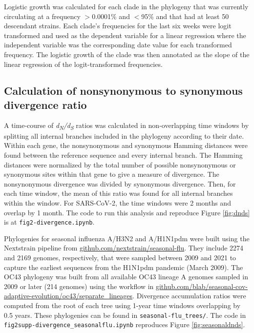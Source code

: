 \documentclass[11pt,oneside,letterpaper]{article}
\newcommand{\dnds}{\emph{d\textsubscript{N}/d\textsubscript{S}}}
\begin{document}
Logistic growth was calculated for each clade in the phylogeny that was currently circulating at a frequency $>$0.0001\% and $<$95\% and that had at least 50 descendant strains.
Each clade's frequencies for the last six weeks were logit transformed and used as the dependent variable for a linear regression where the independent variable was the corresponding date value for each transformed frequency.
The logistic growth of the clade was then annotated as the slope of the linear regression of the logit-transformed frequencies.

\subsection*{Calculation of nonsynonymous to synonymous divergence ratio}
A time-course of \dnds{} ratios was calculated in non-overlapping time windows by splitting all internal branches included in the phylogeny according to their date.
Within each gene, the nonsynonymous and synonymous Hamming distances were found between the reference sequence and every internal branch.
The Hamming distances were normalized by the total number of possible nonsynonymous or synonymous sites within that gene to give a measure of divergence.
The nonsynonymous divergence was divided by synonymous divergence.
Then, for each time window, the mean of this ratio was found for all internal branches within the window.
For SARS-CoV-2, the time windows were 2 months and overlap by 1 month.
The code to run this analysis and reproduce Figure \ref{fig:dnds} is at \texttt{fig2-divergence.ipynb}.

Phylogenies for seasonal influenza A/H3N2 and A/H1N1pdm were built using the Nextstrain pipeline from \href{https://github.com/nextstrain/seasonal-flu}{github.com/nextstrain/seasonal-flu}.
They include 2274 and 2169 genomes, respectively, that were sampled between 2009 and 2021 to capture the earliest sequences from the H1N1pdm pandemic (March 2009).
The OC43 phylogeny was built from all available OC43 lineage A genomes sampled in 2009 or later (214 genomes) using the workflow in \href{https://github.com/blab/seasonal-cov-adaptive-evolution/oc43/separate_lineages}{github.com/blab/seasonal-cov-adaptive-evolution/oc43/separate\_lineages}.
Divergence accumulation ratios were computed from the root of each tree using 1-year time windows overlapping by 0.5 years.
These phylogenies can be found in \texttt{seasonal-flu\_trees/}.
The code in \texttt{fig2supp-divergence\_seasonalflu.ipynb} reproduces Figure \ref{fig:seasonaldnds}.
\end{document}

